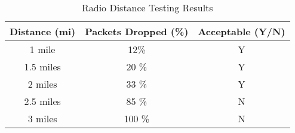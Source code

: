 \begin{table}[H] \label{tab:RadioDistance}
\caption{Radio Distance Testing Results}
\centering
\begin{tabular}{c c c}
\hline\hline
Distance (mi) & Packets Dropped (\%) & Acceptable (Y/N) \\ [0.5ex]
\hline
1 mile & 12\% & Y \\
1.5 miles & 20 \% & Y \\
2 miles & 33 \% & Y \\
2.5 miles & 85 \% & N \\
3 miles & 100 \% & N \\ [1ex]
\hline
\end{tabular}
\end{table}

